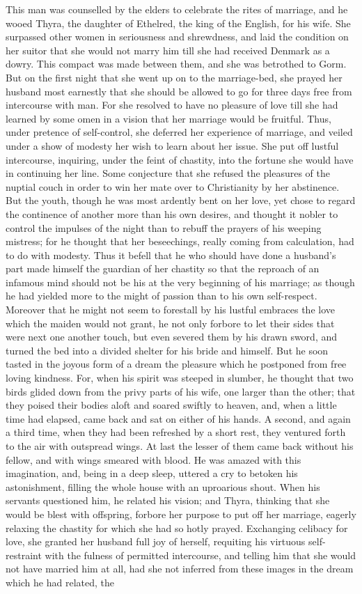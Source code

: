 \documentclass[10pt,a4paper]{report}
\begin{document}
This man was counselled by the elders to celebrate the rites of marriage, and he wooed Thyra, the daughter of Ethelred, the king of the English, for his wife. She surpassed other women in seriousness and shrewdness, and laid the condition on her suitor that she would not marry him till she had received Denmark as a dowry. This compact was made between them, and she was betrothed to Gorm. But on the first night that she went up on to the marriage-bed, she prayed her husband most earnestly that she should be allowed to go for three days free from intercourse with man. For she resolved to have no pleasure of love till she had learned by some omen in a vision that her marriage would be fruitful. Thus, under pretence of self-control, she deferred her experience of marriage, and veiled under a show of modesty her wish to learn about her issue. She put off lustful intercourse, inquiring, under the feint of chastity, into the fortune she would have in continuing her line. Some conjecture that she refused the pleasures of the nuptial couch in order to win her mate over to Christianity by her abstinence. But the youth, though he was most ardently bent on her love, yet chose to regard the continence of another more than his own desires, and thought it nobler to control the impulses of the night than to rebuff the prayers of his weeping mistress; for he thought that her beseechings, really coming from calculation, had to do with modesty. Thus it befell that he who should have done a husband's part made himself the guardian of her chastity so that the reproach of an infamous mind should not be his at the very beginning of his marriage; as though he had yielded more to the might of passion than to his own self-respect. Moreover that he might not seem to forestall by his lustful embraces the love which the maiden would not grant, he not only forbore to let their sides that were next one another touch, but even severed them by his drawn sword, and turned the bed into a divided shelter for his bride and himself. But he soon tasted in the joyous form of a dream the pleasure which he postponed from free loving kindness. For, when his spirit was steeped in slumber, he thought that two birds glided down from the privy parts of his wife, one larger than the other; that they poised their bodies aloft and soared swiftly to heaven, and, when a little time had elapsed, came back and sat on either of his hands. A second, and again a third time, when they had been refreshed by a short rest, they ventured forth to the air with outspread wings. At last the lesser of them came back without his fellow, and with wings smeared with blood. He was amazed with this imagination, and, being in a deep sleep, uttered a cry to betoken his astonishment, filling the whole house with an uproarious shout. When his servants questioned him, he related his vision; and Thyra, thinking that she would be blest with offspring, forbore her purpose to put off her marriage, eagerly relaxing the chastity for which she had so hotly prayed. Exchanging celibacy for love, she granted her husband full joy of herself, requiting his virtuous self-restraint with the fulness of permitted intercourse, and telling him that she would not have married him at all, had she not inferred from these images in the dream which he had related, the 
\end{document}
